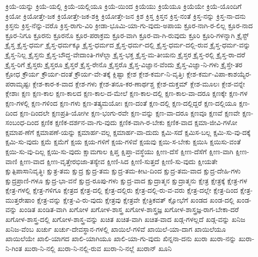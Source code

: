 {ಕ್ರಿಯೆ-ಯನ್ನು
ಕ್ರಿಯೆ-ಯಲ್ಲಿ
ಕ್ರಿಯೆ-ಯಲ್ಲಿಯೂ
ಕ್ರಿಯೆ-ಯಿಂದ
ಕ್ರಿಯೆಯು
ಕ್ರಿಯೆಯೂ
ಕ್ರಿಯೆಯೇ
ಕ್ರಿಯೆ-ಯೊಂದಿಗೆ
ಕ್ರಿಯೋ
ಕ್ರಿಯೋತ್ತೇ-ಜಕ
ಕ್ರಿಯೋತ್ತೇ-ಜಕ-ಶಕ್ತಿ
ಕ್ರಿಯೋತ್ತೇ-ಜನ
ಕ್ರಿಶ
ಕ್ರಿಸ್ತ
ಕ್ರಿಸ್ತನ
ಕ್ರಿಸ್ತ-ನಂತೆ
ಕ್ರಿಸ್ತ-ನನ್ನು
ಕ್ರಿಸ್ತ-ನಾ-ದನು
ಕ್ರಿಸ್ತನು
ಕ್ರಿಸ್ತ-ನೆನ್ನು-ವರೊ
ಕ್ರಿಸ್ತ-ರಾಗು-ವಿರಿ
ಕ್ರೀಡಾ-ಭೂಮಿ-ಯಾ-ಗು-ವುದು-ಅಪಾಯ
ಕ್ರೂರ-ನಾಗಿ-ರ-ಲಿಲ್ಲ
ಕ್ರೂರ-ನಾದ
ಕ್ರೂರ-ನಿಗೂ
ಕ್ರೂರನು
ಕ್ರೂರನೊ
ಕ್ರೂರ-ಪರಾಕ್ರಮ
ಕ್ರೂರ-ವಾಗಿ
ಕ್ರೂರ-ವಾ-ಗಿ-ರುವುದು
ಕ್ರೂರಿ
ಕ್ರೂರಿ-ಗಳನ್ನಾಗಿ
ಕ್ರೈಸ್ಟ್
ಕ್ರೈಸ್ತ
ಕ್ರೈಸ್ತ-ಧರ್ಮ
ಕ್ರೈಸ್ತ-ಧರ್ಮಕ್ಕೂ
ಕ್ರೈಸ್ತ-ಧರ್ಮದ
ಕ್ರೈಸ್ತ-ಧರ್ಮ-ದಲ್ಲಿ
ಕ್ರೈಸ್ತ-ಧರ್ಮ-ದಲ್ಲಿ-ರುವ
ಕ್ರೈಸ್ತ-ಧರ್ಮ-ವನ್ನು
ಕ್ರೈಸ್ತ-ನಿಲ್ಲ
ಕ್ರೈಸ್ತನು
ಕ್ರೈಸ್ತ-ಬೌದ್ಧ-ವೇದಾಂತಿ-ಗಳೆಲ್ಲಾ
ಕ್ರೈಸ್ತ-ಭಕ್ತ
ಕ್ರೈಸ್ತ-ಮ-ತೀಯನು
ಕ್ರೈಸ್ತರ
ಕ್ರೈಸ್ತ-ರಲ್ಲಿ
ಕ್ರೈಸ್ತ-ರಾ-ದರೆ
ಕ್ರೈಸ್ತ-ರಿಗೆ
ಕ್ರೈಸ್ತರು
ಕ್ರೈಸ್ತರೂ
ಕ್ರೈಸ್ತರೆ
ಕ್ರೈಸ್ತ-ರೇನೊ
ಕ್ರೈಸ್ತರೊ
ಕ್ರೈಸ್ತ-ವಿಜ್ಞಾನ-ವೆಂದು
ಕ್ರೈಸ್ತ-ವಿಜ್ಞಾ-ನಿ-ಗಳು
ಕ್ರೈಸ್ತೇ-ತರ
ಕ್ರೋಧ
ಕ್ರೌರ್ಯ
ಕ್ರೌರ್ಯ-ದಂತೆ
ಕ್ರೌರ್ಯ-ವೇ-ತಕ್ಕೆ
ಕ್ಲಿಷ್ಟಾ
ಕ್ಲೇಶ
ಕ್ಲೇಶ-ಕರ್ಮ-ನಿ-ವೃತ್ತಿಃ
ಕ್ಲೇಶ-ಕರ್ಮ-ವಿಪಾ-ಕಾಶಯ್ಯೆರ-ಪರಾಮೃಷ್ಟಃ
ಕ್ಲೇಶ-ಕಾರ-ಕ-ವಾದ
ಕ್ಲೇಶ-ಗಳು
ಕ್ಲೇಶ-ತನೂ-ಕರ-ಣಾರ್ಥಶ್ಚ
ಕ್ಲೇಶ-ದುಕ್ತಮ್
ಕ್ಲೇಶ-ಮೂಲಃ
ಕ್ಲೇಶ-ವನ್ನೇ
ಕ್ಲೇಶಾಃ
ಕ್ಷಣ
ಕ್ಷಣ-ಕಾಲ
ಕ್ಷಣ-ಕಾಲದ
ಕ್ಷಣ-ಕಾಲ-ದ-ಮೇಲೆ
ಕ್ಷಣ-ಕಾಲ-ದಲ್ಲಿ
ಕ್ಷಣ-ಕಾಲ-ವಾ-ದರೂ
ಕ್ಷಣಕ್ಕೇ
ಕ್ಷಣ-ಗಳ
ಕ್ಷಣ-ಗಳಲ್ಲಿ
ಕ್ಷಣ-ಗಳಿಂದ
ಕ್ಷಣ-ಗಳು
ಕ್ಷಣ-ತತ್ಕ್ರಮಯೋಃ
ಕ್ಷಣ-ದಂತೆ
ಕ್ಷಣ-ದಲ್ಲಿ
ಕ್ಷಣ-ದಲ್ಲಿದ್ದರೆ
ಕ್ಷಣ-ದಲ್ಲಿಯೂ
ಕ್ಷಣ-ದಿಂದ
ಕ್ಷಣ-ದಿಂದಲೇ
ಕ್ಷಣಪ್ರತಿ-ಯೋಗೀ
ಕ್ಷಣ-ಭಂಗು-ರವೇ
ಕ್ಷಣ-ವನ್ನು
ಕ್ಷಣ-ವಾ-ದರೂ
ಕ್ಷಣವೂ
ಕ್ಷಣವೆ
ಕ್ಷಣವೇ
ಕ್ಷಣ-ಸಂಬಂಧ-ದಿಂದ
ಕ್ಷಣಿಕ
ಕ್ಷಣಿಕ-ದರ್ಶನ-ವಾ-ಗು-ವುದು
ಕ್ಷಣಿಕ-ವಾಗಿ-ರ-ಬೇಕು
ಕ್ಷಣಿಕ-ವಾದ
ಕ್ಷಮಾ-ಜೀವಿ-ಗಳೋ
ಕ್ಷಮಾಪ-ಣೆಗೆ
ಕ್ಷಮಾಪಣೆ-ಯನ್ನು
ಕ್ಷಮಾರ್ಹ-ವಲ್ಲ
ಕ್ಷಮಾರ್ಹ-ವಾ-ದುದು
ಕ್ಷಮಿ-ಸದೆ
ಕ್ಷಮಿಸ-ಬಲ್ಲ
ಕ್ಷಮಿ-ಸು-ವು-ದಕ್ಕೆ
ಕ್ಷಮಿ-ಸು-ವುದು
ಕ್ಷಮೆ
ಕ್ಷಮೆಗೆ
ಕ್ಷಯ
ಕ್ಷಯ-ಗಳಿಗೆ
ಕ್ಷಯ-ಗಳಿವೆ
ಕ್ಷಯವು
ಕ್ಷಯಿ-ಸ-ಬೇಕು
ಕ್ಷಯಿಸಿ
ಕ್ಷಯಿಸು-ವಂತೆ
ಕ್ಷಯಿ-ಸು-ವು-ದಿಲ್ಲ
ಕ್ಷಯಿ-ಸು-ವುದು
ಕ್ಷಾಮಗಾಲ
ಕ್ಷಿಪ್ತ
ಕ್ಷಿಪ್ತಾ-ವಸ್ಥೆಯು
ಕ್ಷೀಣ-ದೆಸೆ
ಕ್ಷೀಣ-ದೆಸೆಗೆ
ಕ್ಷೀಣ-ವಾಗಿ
ಕ್ಷೀಣ-ವಾಣಿ
ಕ್ಷೀಣ-ವಾದ
ಕ್ಷೀಣ-ವೃತ್ತೇರಭಿಜಾ-ತಸ್ಯೇವ
ಕ್ಷೀಣಿ-ಸಿದ
ಕ್ಷೀಣಿ-ಸುತ್ತದೆ
ಕ್ಷೀಣಿ-ಸು-ವುದು
ಕ್ಷೀಯತೇ
ಕ್ಷುತ್ಪಿಪಾಸಾನಿವೃತ್ಥಿಃ
ಕ್ಷುತ್ರ-ತಮ
ಕ್ಷುದ್ರ
ಕ್ಷುದ್ರ-ತಮ
ಕ್ಷುದ್ರ-ತಮ-ಕೀಟ-ದಿಂದ
ಕ್ಷುದ್ರ-ತಮ-ವಾದ
ಕ್ಷುದ್ರ-ದೇಹಿ-ಗಳು
ಕ್ಷುದ್ರಪ್ರಾಣಿ-ಗಳೂ
ಕ್ಷುದ್ರ-ಭಾ-ವನೆ
ಕ್ಷುದ್ರ-ರೂಪು-ಗಳು
ಕ್ಷುದ್ರ-ವಾದ
ಕ್ಷುದ್ರಾತ್ಮನ
ಕ್ಷುದ್ರಾತ್ಮನು
ಕ್ಷೇತ್ರ
ಕ್ಷೇತ್ರಕ್ಕೆ
ಕ್ಷೇತ್ರ-ಗಳ
ಕ್ಷೇತ್ರ-ಗಳಲ್ಲಿ
ಕ್ಷೇತ್ರ-ಗಳಿಗೂ
ಕ್ಷೇತ್ರದ
ಕ್ಷೇತ್ರ-ದಲ್ಲಿ
ಕ್ಷೇತ್ರ-ದಲ್ಲಿರು
ಕ್ಷೇತ್ರ-ದಲ್ಲಿ-ರು-ವ-ವರು
ಕ್ಷೇತ್ರ-ದಲ್ಲೇ
ಕ್ಷೇತ್ರ-ದಿಂದ
ಕ್ಷೇತ್ರ-ಮುತ್ತರೇಷಾಂ
ಕ್ಷೇತ್ರ-ವನ್ನು
ಕ್ಷೇತ್ರ-ವಿ-ರು-ವುದು
ಕ್ಷೇತ್ರವು
ಕ್ಷೇತ್ರವೇ
ಕ್ಷೇತ್ರಿಕವತ್
ಕ್ಷೋಭೆಗೆ
ಖಂಡದ
ಖಂಡ-ದಲ್ಲಿ
ಖಂಡ-ವನ್ನು
ಖಂಡಿತ
ಖಂಡಿತ-ವಾಗಿ
ಖಗೋಳ
ಖಗೋಳ-ಶಾಸ್ತ್ರ
ಖಗೋಳ-ಶಾಸ್ತ್ರಜ್ಞ
ಖಗೋಳ-ಶಾಸ್ತ್ರಜ್ಞ-ರಾಗ-ಬೇಕಾ-ದರೆ
ಖಗೋಳ-ಶಾಸ್ತ್ರ-ದಲ್ಲಿ
ಖಗೋಳ-ಶಾಸ್ತ್ರ-ವನ್ನು
ಖಚಿತ
ಖಚಿತ-ವಾಗಿ
ಖಚಿತ-ವಾದ
ಖಡ್ಗ-ಗಳಲ್ಲದೆ
ಖಡ್ಗ-ವನ್ನು
ಖನಿಜ
ಖನಿಜ-ವೆಂಬ
ಖರ್ಚು
ಖರ್ಚು-ದೇವಸ್ಥಾನ-ಗಳಲ್ಲಿ
ಖಾಯಿಲೆ-ಗಳಿವೆ
ಖಾಯಿಲೆ-ಯಾ-ದಾಗ
ಖಾಯಿಲೆಯೂ
ಖಾಯಿಲೆಯೇ
ಖಾಲಿ-ಯಾಗದ
ಖಾಲಿ-ಯಾಗಿಯೂ
ಖಾಲಿ-ಯಾ-ಗು-ವುದು
ಖಿನ್ನನಾ-ದನು
ಖುರಾ
ಖುರಾ-ನನ್ನು
ಖುರಾ-ನಿ-ಗಿಂತ
ಖುರಾ-ನಿ-ನಲ್ಲಿ
ಖುರಾ-ನಿ-ನಲ್ಲಿ-ರುವ
ಖುರಾ-ನಿ-ನಲ್ಲೆ
ಖುರಾನ್
ಖೂನಿ
}
